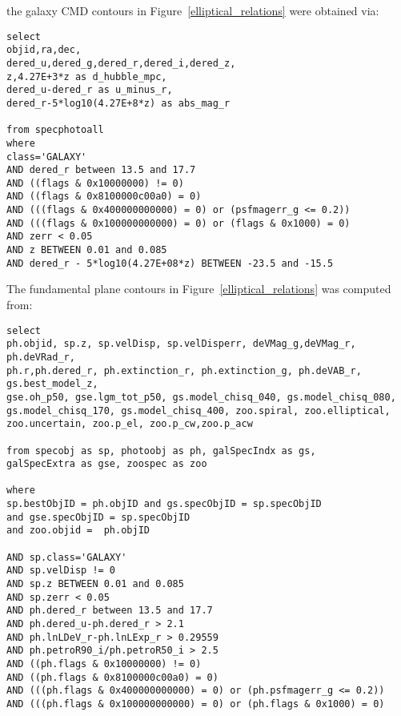 \documentclass{emulateapj}
\begin{document}
the galaxy CMD contours in Figure~\ref{elliptical_relations} were obtained via:
\begin{verbatim}
select 
objid,ra,dec,
dered_u,dered_g,dered_r,dered_i,dered_z,
z,4.27E+3*z as d_hubble_mpc,
dered_u-dered_r as u_minus_r,
dered_r-5*log10(4.27E+8*z) as abs_mag_r 

from specphotoall
where
class='GALAXY'
AND dered_r between 13.5 and 17.7
AND ((flags & 0x10000000) != 0)
AND ((flags & 0x8100000c00a0) = 0)
AND (((flags & 0x400000000000) = 0) or (psfmagerr_g <= 0.2))
AND (((flags & 0x100000000000) = 0) or (flags & 0x1000) = 0)
AND zerr < 0.05
AND z BETWEEN 0.01 and 0.085
AND dered_r - 5*log10(4.27E+08*z) BETWEEN -23.5 and -15.5
\end{verbatim}


The fundamental plane contours in Figure~\ref{elliptical_relations} was computed from:
\begin{verbatim}
select
ph.objid, sp.z, sp.velDisp, sp.velDisperr, deVMag_g,deVMag_r, ph.deVRad_r, 
ph.r,ph.dered_r, ph.extinction_r, ph.extinction_g, ph.deVAB_r,  gs.best_model_z, 
gse.oh_p50, gse.lgm_tot_p50, gs.model_chisq_040, gs.model_chisq_080, 
gs.model_chisq_170, gs.model_chisq_400, zoo.spiral, zoo.elliptical, 
zoo.uncertain, zoo.p_el, zoo.p_cw,zoo.p_acw 

from specobj as sp, photoobj as ph, galSpecIndx as gs, 
galSpecExtra as gse, zoospec as zoo

where
sp.bestObjID = ph.objID and gs.specObjID = sp.specObjID 
and gse.specObjID = sp.specObjID 
and zoo.objid =  ph.objID 

AND sp.class='GALAXY'
AND sp.velDisp != 0
AND sp.z BETWEEN 0.01 and 0.085
AND sp.zerr < 0.05
AND ph.dered_r between 13.5 and 17.7
AND ph.dered_u-ph.dered_r > 2.1
AND ph.lnLDeV_r-ph.lnLExp_r > 0.29559
AND ph.petroR90_i/ph.petroR50_i > 2.5
AND ((ph.flags & 0x10000000) != 0)
AND ((ph.flags & 0x8100000c00a0) = 0)
AND (((ph.flags & 0x400000000000) = 0) or (ph.psfmagerr_g <= 0.2))
AND (((ph.flags & 0x100000000000) = 0) or (ph.flags & 0x1000) = 0)
\end{verbatim}
\end{document}
